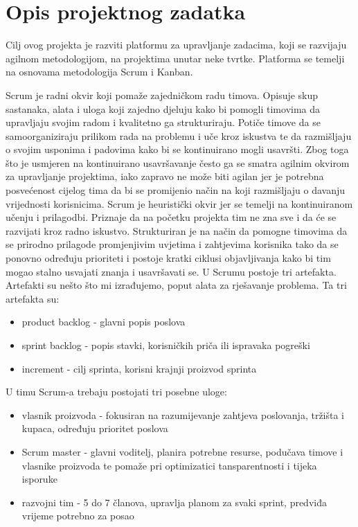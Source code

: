 \chapter{\Large Opis projektnog zadatka}
\par Cilj ovog projekta je razviti platformu za upravljanje zadacima, koji se razvijaju agilnom metodologijom, na projektima unutar neke tvrtke. Platforma se temelji na osnovama metodologija Scrum i Kanban. 
\par Scrum je radni okvir koji pomaže zajedničkom radu timova. Opisuje skup sastanaka, alata i uloga koji zajedno djeluju kako bi pomogli timovima da upravljaju svojim radom i kvalitetno ga strukturiraju. Potiče timove da se samoorganiziraju prilikom rada na problemu i uče kroz iskustva te da razmišljaju o svojim usponima i padovima kako bi se kontinuirano mogli usavršti. Zbog toga što je usmjeren na kontinuirano usavršavanje često ga se smatra agilnim okvirom za upravljanje projektima, iako zapravo ne može biti agilan jer je potrebna posvećenost cijelog tima da bi se promijenio način na koji razmišljaju o davanju vrijednosti korisnicima. Scrum je heuristički okvir jer se temelji na kontinuiranom učenju i prilagodbi. Priznaje da na početku projekta tim ne zna sve i da će se razvijati kroz radno iskustvo. Strukturiran je na način da pomogne timovima da se prirodno prilagode promjenjivim uvjetima i zahtjevima korisnika tako da se ponovno određuju prioriteti i postoje kratki ciklusi objavljivanja kako bi tim mogao stalno usvajati znanja i usavršavati se. U Scrumu postoje tri artefakta. Artefakti su nešto što mi izrađujemo, poput alata za rješavanje problema. Ta tri artefakta su: 
\begin{itemize}
			\item product backlog - glavni popis poslova
			\item sprint backlog - popis stavki, korisničkih priča ili ispravaka pogreški
			\item increment - cilj sprinta, korisni krajnji proizvod sprinta
		\end{itemize}
U timu Scrum-a trebaju postojati tri posebne uloge:
\begin{itemize}
			\item vlasnik proizvoda - fokusiran na razumijevanje zahtjeva poslovanja, tržišta i kupaca, određuju prioritet poslova 
			\item Scrum master - glavni voditelj, planira potrebne resurse, podučava timove i vlasnike proizvoda te pomaže pri optimizatici tansparentnosti i tijeka isporuke 
			\item razvojni tim - 5 do 7 članova, upravlja planom za svaki sprint, predviđa vrijeme potrebno za posao
		\end{itemize}
